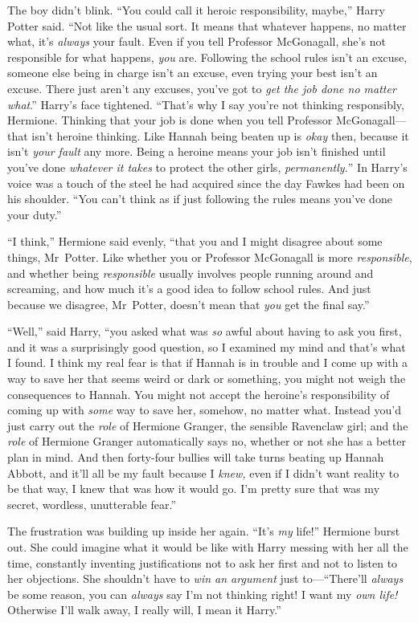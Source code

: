 The boy didn’t blink. “You could call it heroic responsibility, maybe,” Harry Potter said. “Not like the usual sort. It means that whatever happens, no matter what, it’s \emph{always} your fault. Even if you tell Professor McGonagall, she’s not responsible for what happens, \emph{you} are. Following the school rules isn’t an excuse, someone else being in charge isn’t an excuse, even trying your best isn’t an excuse. There just aren’t any excuses, you’ve got to \emph{get the job done no matter what}.” Harry’s face tightened. “That’s why I say you’re not thinking responsibly, Hermione. Thinking that your job is done when you tell Professor McGonagall—that isn’t heroine thinking. Like Hannah being beaten up is \emph{okay} then, because it isn’t \emph{your fault} any more. Being a heroine means your job isn’t finished until you’ve done \emph{whatever it takes} to protect the other girls, \emph{permanently.}” In Harry’s voice was a touch of the steel he had acquired since the day Fawkes had been on his shoulder. “You can’t think as if just following the rules means you’ve done your duty.”

“I think,” Hermione said evenly, “that you and I might disagree about some things, Mr~Potter. Like whether you or Professor McGonagall is more \emph{responsible}, and whether being \emph{responsible} usually involves people running around and screaming, and how much it’s a good idea to follow school rules. And just because we disagree, Mr~Potter, doesn’t mean that \emph{you} get the final say.”

“Well,” said Harry, “you asked what was \emph{so} awful about having to ask you first, and it was a surprisingly good question, so I examined my mind and that’s what I found. I think my real fear is that if Hannah is in trouble and I come up with a way to save her that seems weird or dark or something, you might not weigh the consequences to Hannah. You might not accept the heroine’s responsibility of coming up with \emph{some} way to save her, somehow, no matter what. Instead you’d just carry out the \emph{role} of Hermione Granger, the sensible Ravenclaw girl; and the \emph{role} of Hermione Granger automatically says no, whether or not she has a better plan in mind. And then forty-four bullies will take turns beating up Hannah Abbott, and it’ll all be my fault because I \emph{knew,} even if I didn’t want reality to be that way, I knew that was how it would go. I’m pretty sure that was my secret, wordless, unutterable fear.”

The frustration was building up inside her again. “It’s \emph{my} life!” Hermione burst out. She could imagine what it would be like with Harry messing with her all the time, constantly inventing justifications not to ask her first and not to listen to her objections. She shouldn’t have to \emph{win an argument} just to—“There’ll \emph{always} be some reason, you can \emph{always} say I’m not thinking right! I want my \emph{own life!} Otherwise I’ll walk away, I really will, I mean it Harry.”

